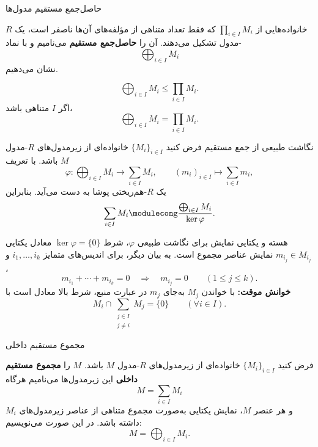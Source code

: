 \begin{frame}{حاصل‌جمع مستقیم مدول‌ها}
    \label{lec04:external-direct-sum}
    \begin{definition}
        خانواده‌هایی از $\prod_{i\in I}M_i$ که فقط تعداد متناهی از
        مؤلفه‌های آن‌ها ناصفر است، یک $R$-مدول تشکیل می‌دهند.
        آن را \textbf{حاصل‌جمع مستقیم} می‌نامیم و با نماد
        \[
            \bigoplus_{i\in I}M_i
        \]
        نشان می‌دهیم.
    \end{definition}
    \[
        \bigoplus_{i\in I}M_i\leq\prod_{i\in I}M_i.
    \]
    اگر $I$ متناهی باشد،
    \[
        \bigoplus_{i\in I}M_i=\prod_{i\in I}M_i.
    \]
\end{frame}

\begin{frame}{نگاشت طبیعی از جمع مستقیم}
    \label{lec04:natural-sum-map}
    فرض کنید $\{M_i\}_{i\in I}$ خانواده‌ای از زیرمدول‌های $R$-مدول $M$ باشد.
    با تعریف
    \[
        \varphi:\bigoplus_{i\in I}M_i\longrightarrow\sum_{i\in I}M_i,
        \qquad (m_i)_{i\in I}\longmapsto\sum_{i\in I}m_i,
    \]
    یک $R$-هم‌ریختی پوشا به دست می‌آید. بنابراین
    \[
        \sum_{i\in I}M_i\modulecong
        \frac{\bigoplus_{i\in I}M_i}{\ker\varphi}.
    \]
\end{frame}

\begin{frame}{هسته و یکتایی نمایش}
    \label{lec04:kernel-uniqueness}
    برای نگاشت طبیعی $\varphi$، شرط $\ker\varphi=\{0\}$ معادل
    یکتایی نمایش عناصر مجموع است.
    به بیان دیگر، برای اندیس‌های متمایز $i_1,\ldots,i_k$ و $m_{i_j}\in M_{i_j}$،
    \[
        m_{i_1}+\cdots+m_{i_k}=0
        \quad\Longrightarrow\quad
        m_{i_j}=0\qquad(1\leq j\leq k).
    \]
    \medskip
    \textbf{خوانش موقت:} با خواندن $M_j$ به‌جای $m_j$ در عبارت منبع،
    شرط بالا معادل است با \lr{[L04-Q04]}
    \[
        M_i\cap\sum_{\substack{j\in I\\j\ne i}}M_j=\{0\}
        \qquad(\forall i\in I).
    \]
\end{frame}

\begin{frame}{مجموع مستقیم داخلی}
    \label{lec04:internal-direct-sum}
    \begin{definition}
        فرض کنید $\{M_i\}_{i\in I}$ خانواده‌ای از زیرمدول‌های $R$-مدول $M$ باشد.
        $M$ را \textbf{مجموع مستقیم داخلی} این زیرمدول‌ها می‌نامیم هرگاه
        \[
            M=\sum_{i\in I}M_i
        \]
        و هر عنصر $M$، نمایش یکتایی به‌صورت مجموع متناهی از
        عناصر زیرمدول‌های $M_i$ داشته باشد.
        در این صورت می‌نویسیم:
        \[
            M=\bigoplus_{i\in I}M_i.
        \]
    \end{definition}
\end{frame}


